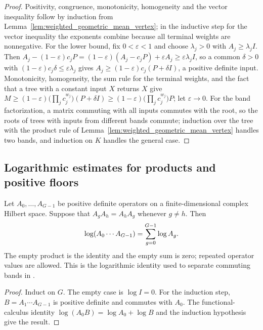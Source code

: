 \begin{proof}\leanok
    Positivity, congruence, monotonicity, homogeneity and the vector
    inequality follow by induction from
    Lemma~\ref{lem:weighted_geometric_mean_vertex}; in the inductive step for
    the vector inequality the exponents combine because all terminal weights
    are nonnegative. For the lower bound, fix $0<\varepsilon<1$ and choose
    $\lambda_j>0$ with $A_j\ge\lambda_jI$. Then
    $A_j-(1-\varepsilon)c_jP=(1-\varepsilon)(A_j-c_jP)+\varepsilon A_j
    \ge\varepsilon\lambda_jI$, so a common $\delta>0$ with
    $(1-\varepsilon)c_j\delta\le\varepsilon\lambda_j$ gives
    $A_j\ge(1-\varepsilon)c_j(P+\delta I)$, a positive definite input.
    Monotonicity, homogeneity, the sum rule for the terminal weights, and the
    fact that a tree with a constant input $X$ returns $X$ give
    $M\ge(1-\varepsilon)\bigl(\prod_jc_j^{w_j}\bigr)(P+\delta I)
    \ge(1-\varepsilon)\bigl(\prod_jc_j^{w_j}\bigr)P$; let $\varepsilon\to0$.
    For the band factorization, a matrix commuting with all inputs commutes
    with the root, so the roots of trees with inputs from different bands
    commute; induction over the tree with the product rule of
    Lemma~\ref{lem:weighted_geometric_mean_vertex} handles two bands, and
    induction on $K$ handles the general case.
\end{proof}

\subsection{Logarithmic estimates for products and positive floors}

\begin{theorem}
\label{thm:cfc_log_ordered_product}
\leanok
Let $A_0,\ldots,A_{G-1}$ be positive definite operators on a
finite-dimensional complex Hilbert space. Suppose that $A_gA_h=A_hA_g$
whenever $g\ne h$. Then
\begin{align}
 \log(A_0\cdots A_{G-1})=\sum_{g=0}^{G-1}\log A_g.
 \notag
\end{align}
The empty product is the identity and the empty sum is zero; repeated
operator values are allowed. This is the logarithmic identity used to
separate commuting bands in \cite[Sections~7 and~8]{OpenAI2026AreaLaw}.
\end{theorem}

\begin{proof}\leanok
Induct on $G$. The empty case is $\log I=0$. For the induction step,
$B=A_1\cdots A_{G-1}$ is positive definite and commutes with $A_0$.
The functional-calculus identity $\log(A_0B)=\log A_0+\log B$ and the
induction hypothesis give the result.
\end{proof}

